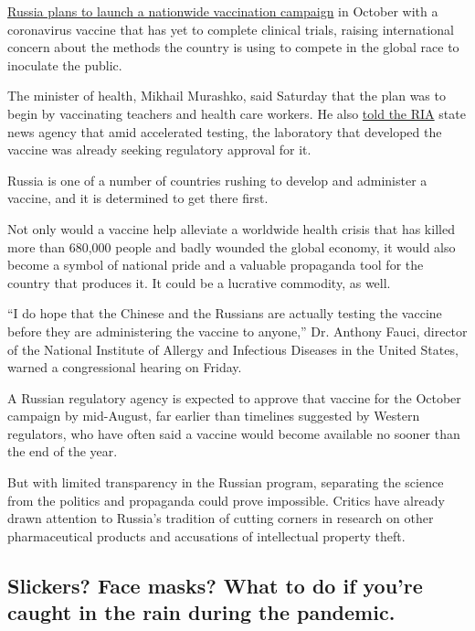 \href{https://www.nytimes3xbfgragh.onion/2020/08/02/world/europe/russia-trials-vaccine-October.html}{Russia
plans to launch a nationwide vaccination campaign} in October with a
coronavirus vaccine that has yet to complete clinical trials, raising
international concern about the methods the country is using to compete
in the global race to inoculate the public.

The minister of health, Mikhail Murashko, said Saturday that the plan
was to begin by vaccinating teachers and health care workers. He also
\href{https://ria.ru/20200801/1575248763.html}{told the RIA} state news
agency that amid accelerated testing, the laboratory that developed the
vaccine was already seeking regulatory approval for it.

Russia is one of a number of countries rushing to develop and administer
a vaccine, and it is determined to get there first.

Not only would a vaccine help alleviate a worldwide health crisis that
has killed more than 680,000 people and badly wounded the global
economy, it would also become a symbol of national pride and a valuable
propaganda tool for the country that produces it. It could be a
lucrative commodity, as well.

``I do hope that the Chinese and the Russians are actually testing the
vaccine before they are administering the vaccine to anyone,'' Dr.
Anthony Fauci, director of the National Institute of Allergy and
Infectious Diseases in the United States, warned a congressional hearing
on Friday.

A Russian regulatory agency is expected to approve that vaccine for the
October campaign by mid-August, far earlier than timelines suggested by
Western regulators, who have often said a vaccine would become available
no sooner than the end of the year.

But with limited transparency in the Russian program, separating the
science from the politics and propaganda could prove impossible. Critics
have already drawn attention to Russia's tradition of cutting corners in
research on other pharmaceutical products and accusations of
intellectual property theft.

\hypertarget{slickers-face-masks-what-to-do-if-youre-caught-in-the-rain-during-the-pandemic}{%
\subsection{Slickers? Face masks? What to do if you're caught in the
rain during the
pandemic.}\label{slickers-face-masks-what-to-do-if-youre-caught-in-the-rain-during-the-pandemic}}

